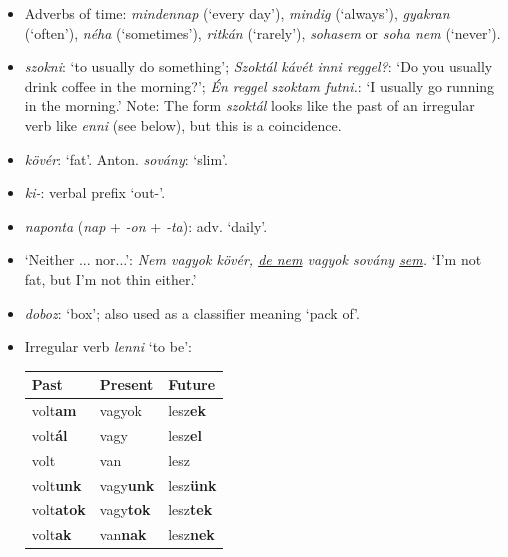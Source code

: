 \documentclass[a4paper,11pt]{article}
\begin{document}
\begin{itemize}
  \item Adverbs of time: \emph{mindennap} (`every day'), \emph{mindig}
    (`always'), \emph{gyakran} (`often'), \emph{néha} (`sometimes'),
    \emph{ritkán} (`rarely'), \emph{sohasem} or \emph{soha nem}
    (`never').



  \item \emph{szokni}: `to usually do something'; \emph{Szoktál kávét
  inni reggel?}: `Do you usually drink coffee in the morning?';
    \emph{Én reggel szoktam futni.}: `I usually go running in the
    morning.' Note: The form \emph{szoktál} looks like the past of an
    irregular verb like \emph{enni} (see below), but this is a
    coincidence.


  \item \emph{kövér}: `fat'. Anton. \emph{sovány}: `slim'.

  \item \emph{ki-}: verbal prefix `out-'.

  \item \emph{naponta} (\emph{nap} + \emph{-on} + \emph{-ta}):
    adv. `daily'.

  \item `Neither ... nor...': \emph{Nem vagyok kövér, \underline{de
    nem} vagyok sovány \underline{sem}.} `I'm not fat, but I'm not
    thin either.'

  \item \emph{doboz}: `box'; also used as a classifier meaning `pack
    of'.

  \item Irregular verb \emph{lenni} `to be':
    \begin{center}
      \begin{tabular}{lll}
        Past & Present & Future\\
        \hline
        volt\textbf{am}   & vagyok           & lesz\textbf{ek} \\
        volt\textbf{ál}   & vagy             & lesz\textbf{el} \\
        volt              & van              & lesz \\
        volt\textbf{unk}  & vagy\textbf{unk} & lesz\textbf{ünk} \\
        volt\textbf{atok} & vagy\textbf{tok} & lesz\textbf{tek} \\
        volt\textbf{ak}   & van\textbf{nak}  & lesz\textbf{nek}
      \end{tabular}
    \end{center}


\end{itemize}
\end{document}

